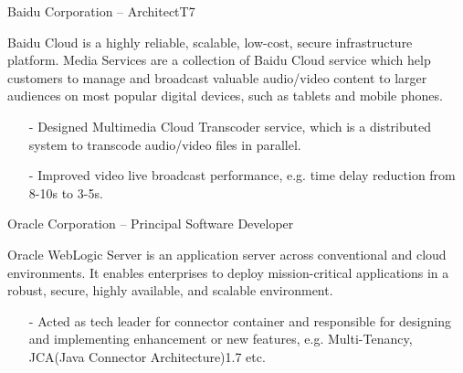 \documentclass[10pt,a4paper]{moderncv}
\begin{document}
\pagebreak
	{ Baidu Corporation -- Architect}{T7}{}{}{}
	\vspace{1ex}

{
	 Baidu Cloud is a highly reliable, scalable, low-cost, secure infrastructure platform.
	 Media Services are a collection of Baidu Cloud service which help customers to manage and broadcast valuable audio/video content to larger audiences on most popular digital devices, such as tablets and mobile phones.
	 \begin{itemize}
		\item[-] Designed Multimedia Cloud Transcoder service, which is a distributed system to transcode audio/video files in parallel.
		\item[-] Improved video live broadcast performance, e.g. time delay reduction from 8-10s to 3-5s.
	 \end{itemize}
}

\vspace{2ex}
\vspace*{0.4\baselineskip}

{ Oracle Corporation -- Principal Software Developer}{}{}{}{}
\vspace{1ex}
{
  Oracle WebLogic Server is an application server across conventional and cloud environments. It enables enterprises to deploy mission-critical applications in a robust, secure, highly available, and scalable environment.
  \begin{itemize}
    \item[-] Acted as tech leader for connector container and responsible for designing and implementing enhancement or
               new features, e.g. Multi-Tenancy, JCA(Java Connector Architecture)1.7 etc.
  \end{itemize}
}
\vspace*{0.4\baselineskip}
\end{document}
